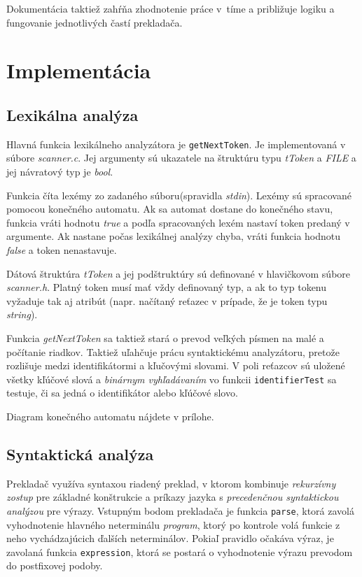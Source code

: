 \documentclass{article}
\begin{document}
        Dokumentácia taktiež zahŕňa zhodnotenie práce v~tíme a približuje logiku a fungovanie
        jednotlivých častí prekladača. 
    
    \section{Implementácia}
    
        \subsection{Lexikálna analýza}
        Hlavná funkcia lexikálneho analyzátora je \texttt{getNextToken}. Je implementovaná v súbore \emph{scanner.c}.
        Jej argumenty sú ukazatele na štruktúru typu \emph{tToken} a \emph{FILE} a jej návratový typ je \emph{bool}. 

        Funkcia číta lexémy zo zadaného súboru(spravidla \emph{stdin}). Lexémy sú spracované pomocou konečného automatu. 
        Ak sa automat dostane do konečného stavu, funkcia vráti hodnotu \emph{true} a podľa spracovaných lexém nastaví
        token predaný v argumente. Ak nastane počas lexikálnej analýzy chyba, vráti funkcia hodnotu \emph{false} a 
        token nenastavuje. 

        Dátová štruktúra \emph{tToken} a jej podštruktúry sú definované v hlavičkovom súbore \emph{scanner.h}. 
        Platný token musí mať vždy definovaný typ, a ak to typ tokenu vyžaduje tak aj atribút 
        (napr. načítaný reťazec v prípade, že je token typu \emph{string}). 

        Funkcia \emph{getNextToken} sa taktiež stará o prevod veľkých písmen na malé a počítanie riadkov.
        Taktiež uľahčuje prácu syntaktickému analyzátoru, pretože rozlišuje medzi identifikátormi a kľučovými slovami.
        V poli reťazcov sú uložené všetky kľúčové slová a \emph{binárnym vyhľadávaním} vo funkcii \texttt{identifierTest} 
        sa testuje, či sa jedná o identifikátor alebo kľúčové slovo.

        Diagram konečného automatu nájdete v prílohe.

        \subsection{Syntaktická analýza}
            Prekladač využíva syntaxou riadený preklad, v ktorom kombinuje \emph{rekurzívny zostup} pre základné konštrukcie
            a príkazy jazyka s \emph{precedenčnou syntaktickou analýzou} pre výrazy.
            Vstupným bodom prekladača je funkcia \texttt{parse}, ktorá zavolá vyhodnotenie hlavného neterminálu \emph{program},
            ktorý po kontrole volá funkcie z neho vychádzajúcich ďalších neterminálov.
            Pokiaľ pravidlo očakáva výraz, je zavolaná funkcia \texttt{expression}, ktorá se postará o vyhodnotenie výrazu prevodom
            do postfixovej podoby.
            
\end{document}
